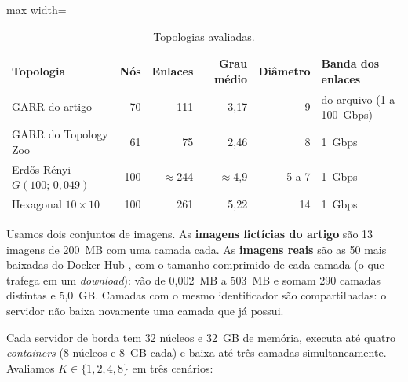 \documentclass[12pt]{article}
\begin{document}
\begin{table}[ht]
\centering
\caption{Topologias avaliadas.}
\label{tab:topologias}
\small
\begin{adjustbox}{max width=\textwidth}
\begin{tabular}{lrrrrl}
\toprule
Topologia & Nós & Enlaces & Grau médio & Diâmetro & Banda dos enlaces \\
\midrule
GARR do artigo & 70 & 111 & 3,17 & 9 & do arquivo (1 a 100~Gbps) \\
GARR do Topology Zoo & 61 & 75 & 2,46 & 8 & 1~Gbps \\
Erdős-Rényi $G(100;\,0{,}049)$ & 100 & $\approx$244 & $\approx$4,9 & 5 a 7 & 1~Gbps \\
Hexagonal $10\times10$ & 100 & 261 & 5,22 & 14 & 1~Gbps \\
\bottomrule
\end{tabular}
\end{adjustbox}
\end{table}

Usamos dois conjuntos de imagens. As \textbf{imagens fictícias do artigo} são 13
imagens de 200~MB com uma camada cada. As \textbf{imagens reais} são as 50 mais
baixadas do Docker Hub \cite{dockerhub}, com o tamanho comprimido de cada camada
(o que trafega em um \textit{download}): vão de 0,002~MB a 503~MB e somam 290
camadas distintas e 5,0~GB. Camadas com o mesmo identificador são compartilhadas:
o servidor não baixa novamente uma camada que já possui.

Cada servidor de borda tem 32 núcleos e 32~GB de memória, executa até quatro
\textit{containers} (8 núcleos e 8~GB cada) e baixa até três camadas
simultaneamente. Avaliamos $K \in \{1, 2, 4, 8\}$ em três cenários:
\end{document}
